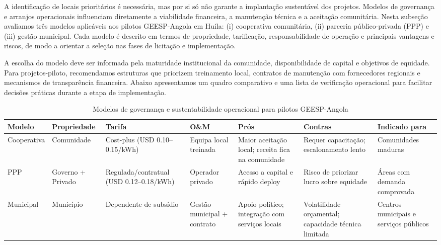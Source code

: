 \documentclass[12pt, a4paper]{article}
\begin{document}
A identificação de locais prioritários é necessária, mas por si só não garante a
implantação sustentável dos projetos. Modelos de governança e arranjos operacionais
influenciam diretamente a viabilidade financeira, a manutenção técnica e a aceitação
comunitária. Nesta subseção avaliamos três modelos aplicáveis aos pilotos GEESP-Angola
em Huíla: (i) cooperativa comunitária, (ii) parceria público-privada (PPP) e (iii)
gestão municipal. Cada modelo é descrito em termos de propriedade, tarificação,
responsabilidade de operação e principais vantagens e riscos, de modo a orientar a
seleção nas fases de licitação e implementação.

A escolha do modelo deve ser informada pela maturidade institucional da comunidade,
disponibilidade de capital e objetivos de equidade. Para projetos-piloto, recomendamos
estruturas que priorizem treinamento local, contratos de manutenção com fornecedores
regionais e mecanismos de transparência financeira. Abaixo apresentamos um quadro
comparativo e uma lista de verificação operacional para facilitar decisões práticas
durante a etapa de implementação.

\begin{table}[ht]
\centering
\caption{Modelos de governança e sustentabilidade operacional para pilotos GEESP-Angola}
\label{tab:governance_models}
\begin{tabular}{|l|l|l|l|p{3.2cm}|p{3.2cm}|l|}
\hline
\textbf{Modelo} & \textbf{Propriedade} & \textbf{Tarifa} & \textbf{O\&M} & \textbf{Prós} & \textbf{Contras} & \textbf{Indicado para} \\
\hline
Cooperativa & Comunidade & Cost-plus (USD 0.10--0.15/kWh) & Equipa local treinada & Maior aceitação local; receita fica na comunidade & Requer capacitação; escalonamento lento & Comunidades maduras \\
\hline
PPP & Governo + Privado & Regulada/contratual (USD 0.12--0.18/kWh) & Operador privado & Acesso a capital e rápido deploy & Risco de priorizar lucro sobre equidade & Áreas com demanda comprovada \\
\hline
Municipal & Município & Dependente de subsídio & Gestão municipal + contrato & Apoio político; integração com serviços locais & Volatilidade orçamental; capacidade técnica limitada & Centros municipais e serviços públicos \\
\hline
\end{tabular}
\end{table}
\end{document}
